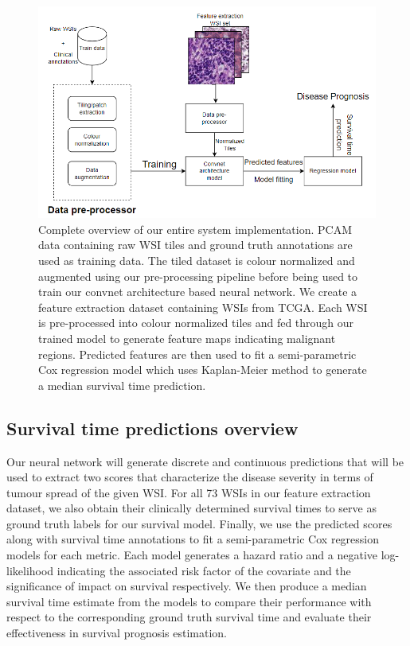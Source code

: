 \documentclass{l4proj}
\begin{document}
\begin{figure}[H]
    \centering
    \includegraphics[scale=0.7]{images/implementation-overview.png}
    \caption{Complete overview of our entire system implementation. PCAM data containing raw WSI tiles and ground truth annotations are used as training data. The tiled dataset is colour normalized and augmented using our pre-processing pipeline before being used to train our convnet architecture based neural network. We create a feature extraction dataset containing WSIs from TCGA. Each WSI is pre-processed into colour normalized tiles and fed through our trained model to generate feature maps indicating malignant regions. Predicted features are then used to fit a semi-parametric Cox regression model which uses Kaplan-Meier method to generate a median survival time prediction.}
    \label{fig:implementation-overview}
\end{figure}

\subsection{Survival time predictions overview}
Our neural network will generate discrete and continuous predictions that will be used to extract two scores that characterize the disease severity in terms of tumour spread of the given WSI. For all 73 WSIs in our feature extraction dataset, we also obtain their clinically determined survival times to serve as ground truth labels for our survival model. Finally, we use the predicted scores along with survival time annotations to fit a semi-parametric Cox regression models for each metric. Each model generates a hazard ratio and a negative log-likelihood indicating the associated risk factor of the covariate and the significance of impact on survival respectively. We then produce a median survival time estimate from the models to compare their performance with respect to the corresponding ground truth survival time and evaluate their effectiveness in survival prognosis estimation.
\end{document}
